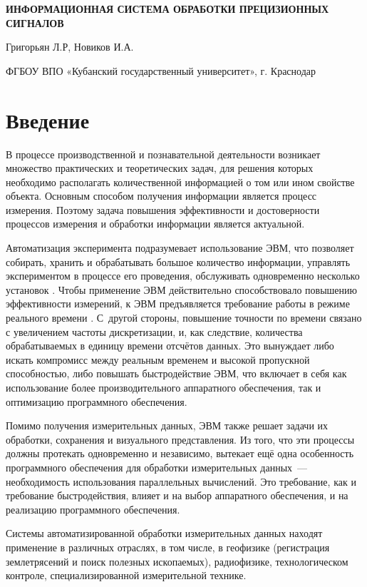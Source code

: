 \documentclass[a4paper, 14pt]{extarticle}
\author{\theauthor, \theinstitute}
\title{\thetitle}
\newcommand\sectiontoc[1]{\section*{#1}\addcontentsline{toc}{section}{#1}}
\newcommand{\thetitle}{ИНФОРМАЦИОННАЯ СИСТЕМА ОБРАБОТКИ ПРЕЦИЗИОННЫХ СИГНАЛОВ}
\newcommand{\theauthor}{Новиков И.А.}
\newcommand{\theinstitute}{ФГБОУ ВПО «Кубанский государственный университет»}
\begin{document}
  \begin{center}
    \textbf{\thetitle}

    Григорьян Л.Р, \theauthor

    \theinstitute, г. Краснодар
  \end{center}

  \sectiontoc{Введение}\label{sec:intro}

  В процессе производственной и познавательной деятельности возникает множество практических и
  теоретических задач, для решения которых необходимо располагать количественной информацией о том
  или ином свойстве объекта. Основным способом получения информации является процесс измерения.
  Поэтому задача повышения эффективности и достоверности процессов измерения и обработки информации
  является актуальной.

  Автоматизация эксперимента подразумевает использование ЭВМ, что позволяет
  собирать, хранить и обрабатывать большое количество информации, управлять экспериментом в процессе
  его проведения, обслуживать одновременно несколько установок \cite{petronevich-automation}.
  Чтобы применение ЭВМ действительно способствовало повышению эффективности измерений, к ЭВМ
  предъявляется требование работы в режиме реального времени
  \cite{tessier-reconfigurable}. С~другой
  стороны, повышение точности по времени связано с увеличением частоты дискретизации, и, как
  следствие, количества обрабатываемых в единицу времени отсчётов данных. Это вынуждает либо искать
  компромисс между реальным временем и высокой пропускной способностью, либо повышать быстродействие
  ЭВМ, что включает в себя как использование более производительного аппаратного обеспечения, так и
  оптимизацию программного обеспечения.

  Помимо получения измерительных данных, ЭВМ также решает задачи их обработки, сохранения и
  визуального представления. Из того, что эти процессы должны протекать одновременно и независимо,
  вытекает ещё одна особенность программного обеспечения для обработки измерительных данных~---
  необходимость использования параллельных вычислений. Это требование, как и требование
  быстродействия, влияет и на выбор аппаратного обеспечения, и на реализацию программного обеспечения.

  Системы автоматизированной обработки измерительных данных находят применение в различных отраслях,
  в том числе, в геофизике (регистрация землетрясений и поиск полезных ископаемых), радиофизике,
  технологическом контроле, специализированной измерительной технике.
\end{document}
